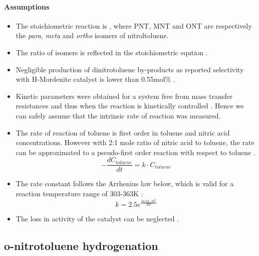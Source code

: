 \paragraph{Assumptions}
\begin{itemize}
    \item The stoichiometric reaction is , where PNT, MNT and ONT are respectively the \textit{para}, \textit{meta} and \textit{ortho} isomers of nitroltoluene.
    \item The ratio of isomers is reflected in the stoichiometric eqution \cite{smith_novel_1998}.
    \item Negligible production of dinitrotoluene by-products as reported selectivity with H-Mordenite catalyst is lower than 0.55mol\% \cite{jeeru_kinetics_2018}.
    \item Kinetic parameters were obtained for a system free from mass transfer resistances and thus when the reaction is kinetically controlled \cite{jeeru_kinetics_2018}. Hence we can safely assume that the intrinsic rate of reaction was measured.
    \item The rate of reaction of toluene is first order in toluene and nitric acid concentrations. However with 2:1 mole ratio of nitric acid to toluene, the rate can be approximated to a pseudo-first order reaction with respect to toluene \cite{jeeru_kinetics_2018}.
    \begin{equation}
    - \frac{dC_{toluene}}{dt}=k \cdot C_{toluene} 
    \end{equation}
    \item The rate constant follows the Arrhenius law below, which is valid for a reaction temperature range of 303-363K \cite{jeeru_kinetics_2018}:
    \begin{equation}
        k=2.5e^{\frac{24.24\cdot 10^{3}}{RT}}
    \end{equation}
    \item The loss in activity of the catalyst can be neglected \cite{jeeru_kinetics_2018}.
\end{itemize}

\subsection{o-nitrotoluene hydrogenation}
